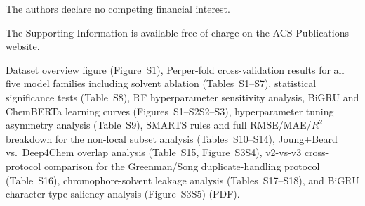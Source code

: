 \documentclass[journal=jcisd8,manuscript=article]{achemso}
\newcommand{\added}[1]{{\color{addedblue}#1}}
\newcommand{\removed}[1]{{\color{removedred}#1}}
\begin{document}
The authors declare no competing financial interest.

\begin{suppinfo}
The Supporting Information is available free of charge on the ACS Publications website.

\added{Dataset overview figure (Figure~S1),} \removed{Per}\added{per}-fold cross-validation results for all five model families including solvent ablation (Tables~S1--S7), statistical significance tests (Table~S8), RF hyperparameter sensitivity analysis, BiGRU and ChemBERTa learning curves (Figures~\removed{S1--S2}\added{S2--S3}), hyperparameter tuning asymmetry analysis (Table~S9), \added{SMARTS rules and full RMSE/MAE/$R^2$ breakdown for the non-local subset analysis (Tables~S10--S14),} \added{Joung+Beard vs.\ Deep4Chem overlap analysis (Table~S15, Figure~\removed{S3}\added{S4}),} \added{v2-vs-v3 cross-protocol comparison for the Greenman/Song duplicate-handling protocol (Table~S16),} \added{chromophore-solvent leakage analysis (Tables~S17--S18),} and BiGRU character-type saliency analysis (Figure~\removed{S3}\added{S5}) (PDF).
\end{suppinfo}


\end{document}
